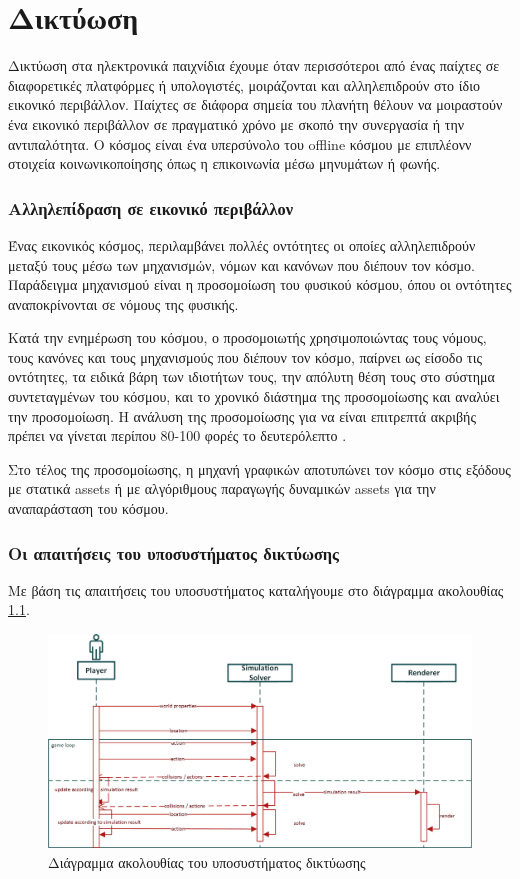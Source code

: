 	\chapter{Δικτύωση}
		Δικτύωση στα ηλεκτρονικά παιχνίδια έχουμε όταν περισσότεροι από ένας παίχτες σε διαφορετικές πλατφόρμες ή υπολογιστές, μοιράζονται και αλληλεπιδρούν στο ίδιο εικονικό περιβάλλον. Παίχτες σε διάφορα σημεία του πλανήτη θέλουν να μοιραστούν ένα εικονικό περιβάλλον σε πραγματικό χρόνο με σκοπό την συνεργασία ή την αντιπαλότητα. O κόσμος είναι ένα υπερσύνολο του offline κόσμου με επιπλέονν στοιχεία κοινωνικοποίησης όπως η επικοινωνία μέσω μηνυμάτων ή φωνής.
		
		\subsection{Αλληλεπίδραση σε εικονικό περιβάλλον}	
		Ένας εικονικός κόσμος, περιλαμβάνει πολλές οντότητες οι οποίες αλληλεπιδρούν μεταξύ τους μέσω των μηχανισμών, νόμων και κανόνων που διέπουν τον κόσμο. Παράδειγμα μηχανισμού είναι η προσομοίωση του φυσικού κόσμου, όπου οι οντότητες αναποκρίνονται σε νόμους της φυσικής.
		
	    Κατά την ενημέρωση του κόσμου, ο προσομοιωτής χρησιμοποιώντας  τους νόμους, τους κανόνες και τους μηχανισμούς που διέπουν τον κόσμο, παίρνει ως είσοδο τις οντότητες, τα ειδικά βάρη των ιδιοτήτων τους, την απόλυτη θέση τους στο σύστημα συντεταγμένων του κόσμου, και το χρονικό διάστημα της προσομοίωσης και αναλύει την προσομοίωση. Η ανάλυση της προσομοίωσης για να είναι επιτρεπτά ακριβής πρέπει να γίνεται περίπου 80-100 φορές το δευτερόλεπτο \cite{gregory2009game}.
		
		Στο τέλος της προσομοίωσης, η μηχανή γραφικών αποτυπώνει τον κόσμο στις εξόδους με στατικά assets ή με αλγόριθμους παραγωγής δυναμικών assets για την αναπαράσταση του κόσμου.
	
		\subsection{Οι απαιτήσεις του υποσυστήματος δικτύωσης}	
		Με βάση τις απαιτήσεις του υποσυστήματος καταλήγουμε στο διάγραμμα ακολουθίας \ref{fig:Network_Sequence_Diagram}.
		
		\begin{figure}[h]
			\centering
			\includegraphics[width=140mm]{Images/gameloop_network_sequence}
			\caption{Διάγραμμα ακολουθίας του υποσυστήματος δικτύωσης}
			\label{fig:Network_Sequence_Diagram}
		\end{figure}		
		
